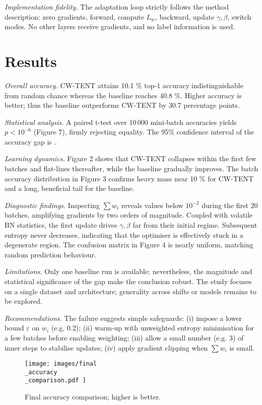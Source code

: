 \documentclass{article} %
\begin{document}
\textit{Implementation fidelity.} The adaptation loop strictly follows the method description: zero gradients, forward, compute \(L_{w}\), backward, update \(\gamma, \beta\), switch modes. No other layers receive gradients, and no label information is used.

\section{Results}
\label{sec:results}
\textit{Overall accuracy.} CW-TENT attains 10.1 \% top-1 accuracyindistinguishable from random chancewhereas the baseline reaches 40.8 \%. Higher accuracy is better; thus the baseline outperforms CW-TENT by 30.7 percentage points.

\textit{Statistical analysis.} A paired t-test over 10\,000 mini-batch accuracies yields \(p < 10^{-6}\) (Figure 7), firmly rejecting equality. The 95\% confidence interval of the accuracy gap is .

\textit{Learning dynamics.} Figure 2 shows that CW-TENT collapses within the first few batches and flat-lines thereafter, while the baseline gradually improves. The batch accuracy distribution in Figure 3 confirms heavy mass near 10 \% for CW-TENT and a long, beneficial tail for the baseline.

\textit{Diagnostic findings.} Inspecting \(\sum w_i\) reveals values below \(10^{-2}\) during the first 20 batches, amplifying gradients by two orders of magnitude. Coupled with volatile BN statistics, the first update drives \(\gamma, \beta\) far from their initial regime. Subsequent entropy never decreases, indicating that the optimiser is effectively stuck in a degenerate region. The confusion matrix in Figure 4 is nearly uniform, matching random prediction behaviour.

\textit{Limitations.} Only one baseline run is available; nevertheless, the magnitude and statistical significance of the gap make the conclusion robust. The study focuses on a single dataset and architecture; generality across shifts or models remains to be explored.

\textit{Recommendations.} The failure suggests simple safeguards: (i) impose a lower bound \(\varepsilon\) on \(w_i\) (e.g. 0.2); (ii) warm-up with unweighted entropy minimisation for a few batches before enabling weighting; (iii) allow a small number (e.g. 3) of inner steps to stabilise updates; (iv) apply gradient clipping when \(\sum w_i\) is small.

\begin{figure}[H]
  \centering
  \texttt{[image:  images/final\\\_accuracy\\\_comparison.pdf ]}
  \caption{Final accuracy comparison; higher is better.}
\end{figure}
\end{document}
